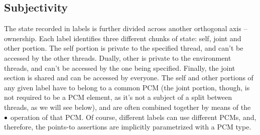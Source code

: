 \subsection{Subjectivity}
The state recorded in labels is further divided across another
orthogonal axis -- ownership. Each label identifies three different
chunks of state: self, joint and other portion. The self portion is
private to the specified thread, and can't be accessed by the other
threads. Dually, other is private to the environment threads, and
can't be accessed by the one being specified. Finally, the joint
section is shared and can be accessed by everyone. The self and other
portions of any given label have to belong to a common PCM (the joint
portion, though, is not required to be a PCM element, as it's not a
subject of a split between threads, as we will see below), and are
often combined together by means of the $\bullet$ operation of that
PCM. Of course, different labels can use different PCMs, and,
therefore, the points-to assertions are implicitly parametrized with a
PCM type.


